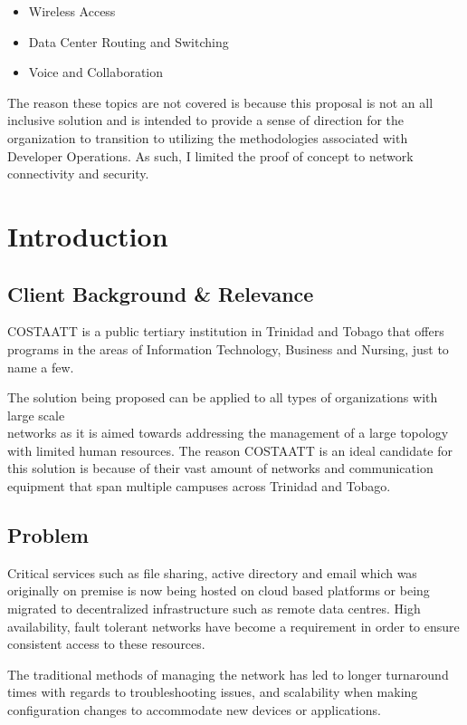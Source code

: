 \documentclass[12pt, letterpaper]{article}
\begin{document}
\begin{itemize}
\item Wireless Access
\item Data Center Routing and Switching
\item Voice and Collaboration
\end{itemize}

The reason these topics are not covered is because this proposal is not an all inclusive solution and is intended to provide a sense of direction for the organization to transition to utilizing the methodologies associated with Developer Operations. As such, I limited the proof of concept to network connectivity and security. 

	
	
\newpage
\section{Introduction}

	\subsection{Client Background \& Relevance}
COSTAATT is a public tertiary institution in Trinidad and Tobago that offers programs in the areas of Information Technology, Business and Nursing, just to name a few.
	
\medskip

The solution being proposed can be applied to all types of organizations with large scale \\
networks as it is aimed towards addressing the management of a large topology with limited human resources. The reason COSTAATT is an ideal candidate for this solution is because of their vast amount of networks and communication equipment that span multiple campuses across Trinidad and Tobago. 

	\subsection{Problem}
Critical services such as file sharing, active directory and email which was originally on premise is now being hosted on cloud based platforms or being migrated to decentralized infrastructure such as remote data centres. High availability, fault tolerant networks have become a requirement in order to ensure consistent access to these resources.

\medskip

The traditional methods of managing the network has led to longer turnaround times with regards to troubleshooting issues, and scalability when making configuration changes to accommodate new devices or applications.
\end{document}
